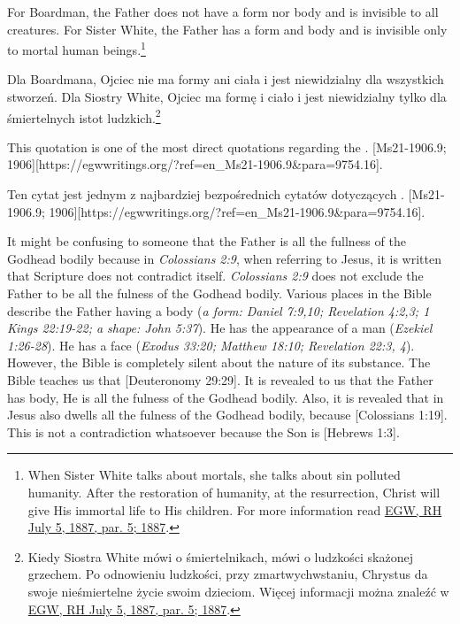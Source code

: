 For Boardman, the Father does not have a form nor body and is invisible to all creatures. For Sister White, the Father has a form and body and is invisible only to mortal human beings.\footnote{When Sister White talks about mortals, she talks about sin polluted humanity. After the restoration of humanity, at the resurrection, Christ will give His immortal life to His children. For more information read \href{https://egwwritings.org/?ref=en_RH.July.5.1887.par.5}{EGW, RH July 5, 1887, par. 5; 1887}.}


Dla Boardmana, Ojciec nie ma formy ani ciała i jest niewidzialny dla wszystkich stworzeń. Dla Siostry White, Ojciec ma formę i ciało i jest niewidzialny tylko dla śmiertelnych istot ludzkich.\footnote{Kiedy Siostra White mówi o śmiertelnikach, mówi o ludzkości skażonej grzechem. Po odnowieniu ludzkości, przy zmartwychwstaniu, Chrystus da swoje nieśmiertelne życie swoim dzieciom. Więcej informacji można znaleźć w \href{https://egwwritings.org/?ref=en_RH.July.5.1887.par.5}{EGW, RH July 5, 1887, par. 5; 1887}.}


This quotation is one of the most direct quotations regarding the . [Ms21-1906.9; 1906][https://egwwritings.org/?ref=en\_Ms21-1906.9&para=9754.16].


Ten cytat jest jednym z najbardziej bezpośrednich cytatów dotyczących . [Ms21-1906.9; 1906][https://egwwritings.org/?ref=en\_Ms21-1906.9&para=9754.16].


It might be confusing to someone that the Father is all the fullness of the Godhead bodily because in \textit{Colossians 2:9}, when referring to Jesus, it is written that  Scripture does not contradict itself. \textit{Colossians 2:9} does not exclude the Father to be all the fulness of the Godhead bodily. Various places in the Bible describe the Father having a body (\textit{a form: Daniel 7:9,10; Revelation 4:2,3; 1 Kings 22:19-22; a shape: John 5:37}). He has the appearance of a man (\textit{Ezekiel 1:26-28}). He has a face (\textit{Exodus 33:20; Matthew 18:10; Revelation 22:3, 4}). However, the Bible is completely silent about the nature of its substance. The Bible teaches us that [Deuteronomy 29:29]. It is revealed to us that the Father has body, He is all the fulness of the Godhead bodily. Also, it is revealed that in Jesus also dwells all the fulness of the Godhead bodily, because [Colossians 1:19]. This is not a contradiction whatsoever because the Son is [Hebrews 1:3].


